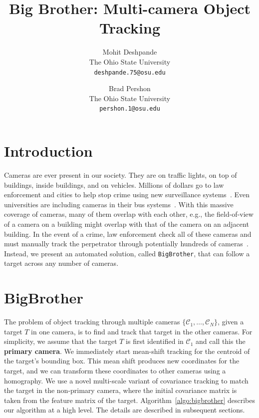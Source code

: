 \documentclass{article}
\begin{document}
\title{Big Brother: Multi-camera Object Tracking}

\author{
  Mohit Deshpande\\
  The Ohio State University\\
  \texttt{deshpande.75@osu.edu}
  \and
  Brad Pershon\\
  The Ohio State University\\
  \texttt{pershon.1@osu.edu}
}

\date{}

\maketitle


\section{Introduction}
Cameras are ever present in our society. They are on traffic lights, on top of buildings, inside buildings, and on vehicles. Millions of dollars go to law enforcement and cities to help stop crime using new surveillance systems~\cite{surveillance}. Even universities are including cameras in their bus systems~\cite{cabs}. With this massive coverage of cameras, many of them overlap with each other, e.g., the field-of-view of a camera on a building might overlap with that of the camera on an adjacent building. In the event of a crime, law enforcement check all of these cameras and must manually track the perpetrator through potentially hundreds of cameras~\cite{surveillance}. Instead, we present an automated solution, called \texttt{BigBrother}, that can follow a target across any number of cameras. 

\section{BigBrother}
\label{sec:bigbrother}
The problem of object tracking through multiple cameras $\{\mathcal{C}_1,\dots,\mathcal{C}_N\}$, given a target $T$ in one camera, is to find and track that target in the other cameras. For simplicity, we assume that the target $T$ is first identified in $\mathcal{C}_1$ and call this the \textbf{primary camera}. We immediately start mean-shift tracking for the centroid of the target's bounding box. This mean shift produces new coordinates for the target, and we can transform these coordinates to other cameras using a homography. We use a novel multi-scale variant of covariance tracking to match the target in the non-primary camera, where the initial covariance matrix is taken from the feature matrix of the target. Algorithm~\ref{algo:bigbrother} describes our algorithm at a high level. The details are described in subsequent sections.
\end{document}
